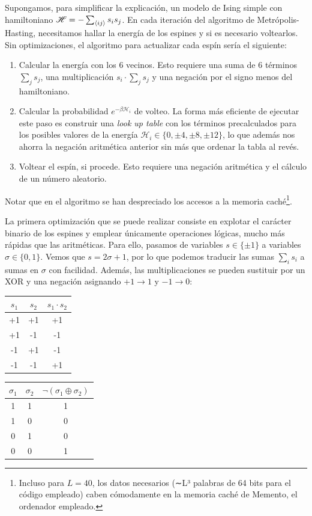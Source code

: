 \documentclass[11pt]{report}
\newcommand{\Ham}{\mathscr{H}}
\begin{document}
\begin{appendices}
Supongamos, para simplificar la explicación, un modelo de Ising simple
con hamiltoniano $\Ham = - \sum_{\expval{ij}}s_is_j$.
En cada iteración del algoritmo de Metrópolis-Hasting, necesitamos hallar
la energía de los espines y si es necesario voltearlos. Sin
optimizaciones, el algoritmo para actualizar cada espín sería el siguiente:
\begin{enumerate}
\item Calcular la energía con los 6 vecinos. Esto requiere una suma de
  6 términos $\sum_{j}s_j$, una multiplicación $s_i ⋅ \sum_{j}s_j$ y
  una negación por el signo menos del hamiltoniano.
\item Calcular la probabilidad $e^{-β \Ham_i}$ de volteo. La forma más
  eficiente de ejecutar este paso es construir una \textit{look up
    table} con los términos precalculados para los posibles valores de
  la energía $\Ham_i ∈ \{0,±4,±8,±12\}$, lo que además nos ahorra la
  negación aritmética anterior sin más que ordenar la tabla al revés.
\item Voltear el espín, si procede. Esto requiere una negación
  aritmética y el cálculo de un número aleatorio.
\end{enumerate}
Notar que en el algoritmo se han despreciado los accesos a la memoria
caché\footnote{Incluso para $L=40$, los datos necesarios (∼L³
  palabras de 64 bits para el código empleado) caben cómodamente en la
  memoria caché de Memento, el ordenador empleado.}.

La primera optimización que se puede realizar consiste en explotar el
carácter binario de los espines y emplear únicamente operaciones lógicas,
mucho más rápidas que las aritméticas. Para ello, pasamos de variables
$s∈\{±1\}$ a variables $σ∈\{0,1\}$. Vemos que $s=2σ+1$, por lo que
podemos traducir las sumas $\sum_{i}s_i$ a sumas en $σ$ con
facilidad. Además, las multiplicaciones se pueden sustituir por un
XOR y una negación asignando $+1→1$ y $-1→0$:
\begin{center}
  \begin{tabular}{cc|c}
    $s_1$ & $s_2$ & $s_1⋅s_2$ \\ \hline
    +1    & +1    &  +1 \\
    +1    & -1    &  -1 \\
    -1    & +1    &  -1 \\
    -1    & -1    &  +1 \\
  \end{tabular}
  \qquad
  \begin{tabular}{cc|c}
    $σ_1$ & $σ_2$ & $¬(σ_1⊕σ_2)$ \\ \hline
    1     & 1     & 1 \\
    1     & 0     & 0 \\
    0     & 1     & 0 \\
    0     & 0     & 1 \\
  \end{tabular}
\end{center}


\end{appendices}
\end{document}
